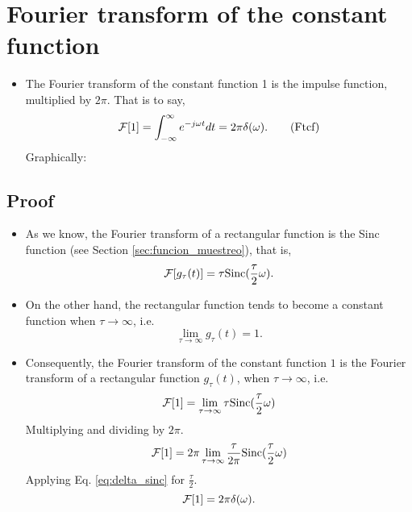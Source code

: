 \section{Fourier transform of the constant function}
\begin{itemize}
\item [] The Fourier transform of the constant function 1 is the
  impulse function, multiplied by $2\pi$. That is to say,
  \begin{equation}
    {\cal{F}}[1] = \int_{-\infty}^\infty e^{-j\omega t}dt = 2\pi\delta(\omega).
    \tag{Ftcf}
    \label{eq:TFfc}
  \end{equation}
  Graphically:
\end{itemize}

\subsection*{Proof}
\begin{itemize}
\item As we know, the Fourier transform of a rectangular function is
  the Sinc function (see Section \ref{sec:funcion_muestreo}), that is,
  \begin{equation*}
    {\cal F}[g_\tau(t)] = \tau\mathrm{Sinc}(\frac{\tau}{2}\omega).
  \end{equation*}
\item On the other hand, the rectangular function tends to become a
  constant function when $\tau\rightarrow\infty$, i.e.
  \begin{equation*}
    \lim_{\tau\rightarrow\infty} g_\tau(t) = 1.
  \end{equation*}
\item Consequently, the Fourier transform of the constant function $1$ is the Fourier transform of a rectangular function $g_\tau(t)$, when $\tau\rightarrow\infty$, i.e.
  \begin{equation*}
    {\cal F}[1] = \displaystyle\lim_{\tau\rightarrow\infty} \tau\mathrm{Sinc}(\frac{\tau}{2}\omega)
  \end{equation*}
  Multiplying and dividing by $2\pi$.
  \begin{equation*}
    {\cal F}[1] = \displaystyle2\pi\lim_{\tau\rightarrow\infty}
    \frac{\tau}{2\pi}\text{Sinc}(\frac{\tau}{2}\omega)
  \end{equation*}
  Applying Eq. \ref{eq:delta_sinc} for $\frac{\tau}{2}$.
  \begin{equation*}
    {\cal F}[1] =2\pi\delta(\omega).
  \end{equation*}
  
\end{itemize}

